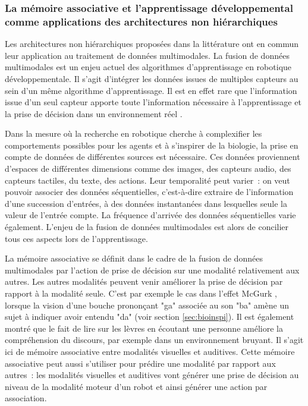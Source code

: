 \documentclass[../main]{subfiles}
\begin{document}
\subsubsection{La mémoire associative et l'apprentissage développemental comme applications des architectures non hiérarchiques}

Les architectures non hiérarchiques proposées dans la littérature ont en commun leur application au traitement de données multimodales.
La fusion de données multimodales est un enjeu actuel des algorithmes d'apprentissage en robotique développementale.
Il s'agit d'intégrer les données issues de multiples capteurs au sein d'un même algorithme d'apprentissage.
Il est en effet rare que l'information issue d'un seul capteur apporte toute l'information nécessaire à l'apprentissage et la prise de décision dans un environnement réel \parencite{lahat2015}. 

Dans la mesure où la recherche en robotique cherche à complexifier les comportements possibles pour les agents et à s'inspirer de la biologie, la prise en compte de données de différentes sources est nécessaire. Ces données proviennent d'espaces de différentes dimensions comme des images, des capteurs audio, des capteurs tactiles, du texte, des actions. Leur temporalité peut varier~: on veut pouvoir associer des données séquentielles, c'est-à-dire extraire de l'information d'une succession d'entrées, à des données instantanées dans lesquelles seule la valeur de l'entrée compte. La fréquence d'arrivée des données séquentielles varie également.
L'enjeu de la fusion de données multimodales est alors de concilier tous ces aspects lors de l'apprentissage.

La mémoire associative se définit dans le cadre de la fusion de données multimodales par l'action de prise de décision sur une modalité relativement aux autres.
Les autres modalités peuvent venir améliorer la prise de décision par rapport à la modalité seule. C'est par exemple le cas dans l'effet McGurk \parencite{McGurk1976HearingLA}, lorsque la vision d'une bouche prononçant "ga" associée au son "ba" amène un sujet à indiquer avoir entendu "da" (voir section \ref{sec:bioinspi}). Il est également montré que le fait de lire sur les lèvres en écoutant une personne améliore la compréhension du discours, par exemple dans un environnement bruyant. Il s'agit ici de mémoire associative entre modalités visuelles et auditives.
Cette mémoire associative peut aussi s'utiliser pour prédire une modalité par rapport aux autres~: les modalités visuelles et auditives vont générer une prise de décision au niveau de la modalité moteur d'un robot et ainsi générer une action par association.
\end{document}
